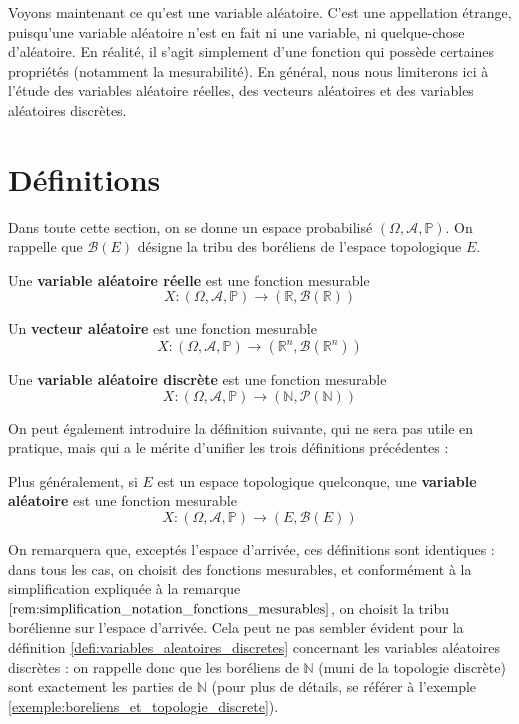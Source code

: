 \documentclass[../integ-proba.tex]{subfiles}
\begin{document}
Voyons maintenant ce qu'est une variable aléatoire.
C'est une appellation étrange, puisqu'une variable aléatoire n'est en fait ni une variable, ni quelque-chose d'aléatoire.
En réalité, il s'agit simplement d'une fonction qui possède certaines propriétés (notamment la mesurabilité).
En général, nous nous limiterons ici à l'étude des variables aléatoire réelles, des vecteurs aléatoires et des variables aléatoires discrètes.

\section{Définitions}

Dans toute cette section, on se donne un espace probabilisé $\left(\Omega, \mathcal{A}, \mathbb{P}\right)$.
On rappelle que $\mathcal{B}(E)$ désigne la tribu des boréliens de l'espace topologique $E$.

\begin{defi}
    Une \textbf{variable aléatoire réelle} est une fonction mesurable
    $$X:\left(\Omega, \mathcal{A}, \mathbb{P}\right) \longrightarrow \left(\mathbb{R}, \mathcal{B}(\mathbb{R})\right)$$
\end{defi}

\begin{defi}
    Un \textbf{vecteur aléatoire} est une fonction mesurable
    $$X:\left(\Omega, \mathcal{A}, \mathbb{P}\right) \longrightarrow \left(\mathbb{R}^n, \mathcal{B}(\mathbb{R}^n)\right)$$
\end{defi}

\begin{defi}
    \label{defi:variables_aleatoires_discretes}
    Une \textbf{variable aléatoire discrète} est une fonction mesurable
    $$X:\left(\Omega, \mathcal{A}, \mathbb{P}\right) \longrightarrow \left(\mathbb{N}, \mathcal{P}(\mathbb{N})\right)$$
\end{defi}

On peut également introduire la définition suivante, qui ne sera pas utile en pratique, mais qui a le mérite d'unifier les trois définitions précédentes :

\begin{defi}
    Plus généralement, si $E$ est un espace topologique quelconque, une \textbf{variable aléatoire} est une fonction mesurable
    $$X:\left(\Omega, \mathcal{A}, \mathbb{P}\right) \longrightarrow \left(E, \mathcal{B}(E)\right)$$
\end{defi}

\begin{rem}
    On remarquera que, exceptés l'espace d'arrivée, ces définitions sont identiques : dans tous les cas, on choisit des fonctions mesurables, et conformément à la simplification expliquée à la remarque $\ref{rem:simplification_notation_fonctions_mesurables}$, on choisit la tribu borélienne sur l'espace d'arrivée.
    Cela peut ne pas sembler évident pour la définition \ref{defi:variables_aleatoires_discretes} concernant les variables aléatoires discrètes : on rappelle donc que les boréliens de $\mathbb{N}$ (muni de la topologie discrète) sont exactement les parties de $\mathbb{N}$ (pour plus de détails, se référer à l'exemple \ref{exemple:boreliens_et_topologie_discrete}).
\end{rem}
\end{document}
